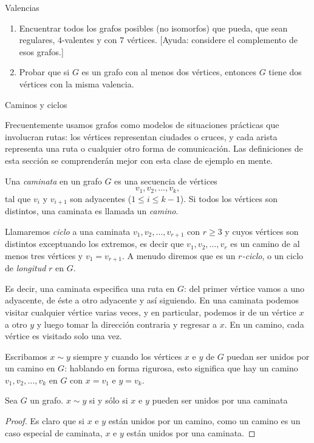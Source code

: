 \begin{section}{Valencias}
\begin{enumerate}
\item Encuentrar todos los grafos posibles (no isomorfos) que pueda, que sean regulares, $4$-valentes y con $7$ vértices. [Ayuda: considere el complemento de esos grafos.]

\item Probar que si $G$ es un grafo con al menos dos vértices, entonces $G$ tiene dos vértices con la misma valencia.
\end{enumerate}

\end{section}


\begin{section}{Caminos y ciclos}\label{5.4}

Frecuentemente usamos grafos como modelos de situaciones prácticas que involucran rutas: los vértices representan ciudades o cruces, y cada arista representa una ruta o cualquier otro forma de comunicación. Las definiciones de esta sección se comprenderán mejor con esta clase de ejemplo en mente.

\begin{definicion}  Una \textit{caminata} en un grafo $G$ es   una secuencia de vértices
$$
v_1,v_2,\ldots,v_k,
$$
tal que $v_i$ y $v_{i+1}$ son adyacentes ($1 \le i \le k-1$). Si todos los vértices son distintos, una caminata es llamada un \textit{camino}.  

Llamaremos \textit{ciclo} a una caminata  $v_1,v_2,\ldots,v_{r+1}$  con $r \ge 3$ y cuyos vértices son distintos exceptuando los extremos, es decir que $v_1,v_2,\ldots,v_{r}$ es un camino de al menos tres vértices y $v_1=v_{r+1}$.  A menudo diremos que es un \textit{$r$-ciclo}, o un ciclo de \textit{longitud} $r$ en $G$.  
\end{definicion}

Es decir, una caminata especifica una ruta en $G$: del primer vértice vamos a uno adyacente, de éste a otro adyacente y así siguiendo. En una caminata podemos visitar cualquier vértice varias veces, y en particular, podemos ir de un vértice $x$ a otro $y$ y luego tomar la dirección contraria y regresar a $x$. En un camino, cada vértice es visitado solo una vez.

Escribamos $x \sim y$ siempre y cuando los vértices $x$ e $y$ de $G$ puedan ser unidos por un camino en $G$: hablando en forma rigurosa, esto significa que hay un camino $v_1,v_2,\ldots,v_k$ en $G$ con $x=v_1$ e $y=v_k$. 

\begin{lema} Sea $G$ un grafo. $x \sim y$ si  y sólo si $x$ e $y$ pueden ser unidos por una caminata 
\end{lema}
\begin{proof}Es claro que si $x$ e $y$ están unidos por un camino, como  un camino es un caso especial de caminata, $x$ e $y$ están unidos por una caminata.


\end{proof}
\end{section}

